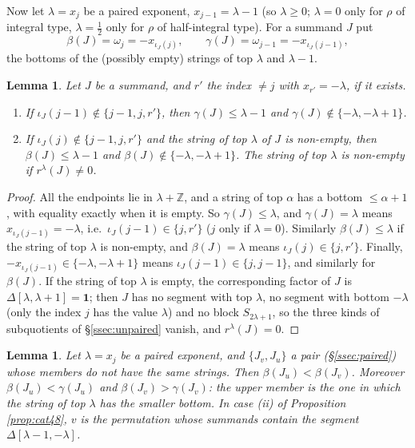 \documentclass[a4paper,12pt,leqno]{amsart}
\theoremstyle{plain}
\newtheorem{lemma}[thm]{Lemma}
\theoremstyle{definition}
\providecommand{\bbZ}{\mathbb{Z}}\providecommand{\bbC}{\mathbb{C}}\providecommand{\Id}{\mathrm{Id}}\providecommand{\Irr}{\mathbf{Irr}}\providecommand{\Alg}{\mathrm{Alg}}
\begin{document}
Now let $\lambda=x_j$ be a paired exponent, $x_{j-1}=\lambda-1$ (so $\lambda\geq0$; $\lambda=0$ only
for $\rho$ of integral type, $\lambda=\tfrac12$ only for $\rho$ of half-integral type). For a summand $J$ put
\[\beta(J)=\omega_j=-x_{\iota_J(j)},\qquad\gamma(J)=\omega_{j-1}=-x_{\iota_J(j-1)},\]
the bottoms of the (possibly empty) strings of top $\lambda$ and $\lambda-1$.

\begin{lemma}\label{lem:betagamma} Let $J$ be a summand, and $r'$ the index $\neq j$ with $x_{r'}=-\lambda$,
if it exists.
\begin{enumerate}
\item[(a)] If $\iota_J(j-1)\notin\{j-1,j,r'\}$, then $\gamma(J)\leq\lambda-1$ and
$\gamma(J)\notin\{-\lambda,-\lambda+1\}$.
\item[(b)] If $\iota_J(j)\notin\{j-1,j,r'\}$ and the string of top $\lambda$ of $J$ is non-empty, then
$\beta(J)\leq\lambda-1$ and $\beta(J)\notin\{-\lambda,-\lambda+1\}$. The string of top $\lambda$ is non-empty
if $r^\lambda(J)\neq0$.
\end{enumerate}
\end{lemma}

\begin{proof}
All the endpoints lie in $\lambda+\bbZ$, and a string of top $\alpha$ has a bottom $\leq\alpha+1$, with
equality exactly when it is empty. So $\gamma(J)\leq\lambda$, and $\gamma(J)=\lambda$ means
$x_{\iota_J(j-1)}=-\lambda$, i.e.\ $\iota_J(j-1)\in\{j,r'\}$ ($j$ only if $\lambda=0$). Similarly
$\beta(J)\leq\lambda$ if the string of top $\lambda$ is non-empty, and $\beta(J)=\lambda$ means
$\iota_J(j)\in\{j,r'\}$. Finally, $-x_{\iota_J(j-1)}\in\{-\lambda,-\lambda+1\}$ means $\iota_J(j-1)\in\{j,j-1\}$,
and similarly for $\beta(J)$. If the string of top $\lambda$ is empty, the
corresponding factor of $J$ is $\Delta[\lambda,\lambda+1]=\mathbf 1$; then $J$ has no segment with top
$\lambda$, no segment with bottom $-\lambda$ (only the index $j$ has the value $\lambda$) and no block
$S_{2\lambda+1}$, so the three kinds of subquotients of \S\ref{ssec:unpaired} vanish, and $r^\lambda(J)=0$.
\end{proof}

\begin{lemma}\label{lem:betapair} Let $\lambda=x_j$ be a paired exponent, and $\{J_v,J_u\}$ a pair
(\S\ref{ssec:paired}) whose members do not have the same strings. Then $\beta(J_u)<\beta(J_v)$. Moreover
$\beta(J_u)<\gamma(J_u)$ and $\beta(J_v)>\gamma(J_v)$: the upper member is the one in which the string of top
$\lambda$ has the smaller bottom. In case (ii)
of Proposition \ref{prop:cat48}, $v$ is the permutation whose summands contain the segment
$\Delta[\lambda-1,-\lambda]$.
\end{lemma}
\end{document}
